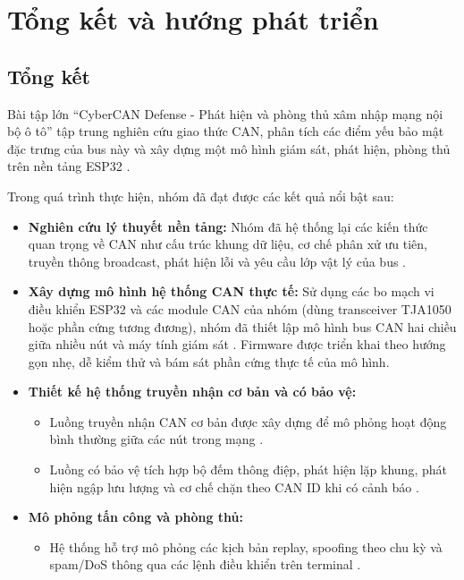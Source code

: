 \chapter{Tổng kết và hướng phát triển}

\section{Tổng kết}
Bài tập lớn ``CyberCAN Defense - Phát hiện và phòng thủ xâm nhập mạng nội bộ ô tô'' tập trung nghiên cứu giao thức CAN, phân tích các điểm yếu bảo mật đặc trưng của bus này và xây dựng một mô hình giám sát, phát hiện, phòng thủ trên nền tảng ESP32 \cite{bosch-can20,koscher2010,miller2015}.

Trong quá trình thực hiện, nhóm đã đạt được các kết quả nổi bật sau:
\begin{itemize}[leftmargin=*]
    \item \textbf{Nghiên cứu lý thuyết nền tảng:} Nhóm đã hệ thống lại các kiến thức quan trọng về CAN như cấu trúc khung dữ liệu, cơ chế phân xử ưu tiên, truyền thông broadcast, phát hiện lỗi và yêu cầu lớp vật lý của bus \cite{bosch-can20}.
    \item \textbf{Xây dựng mô hình hệ thống CAN thực tế:} Sử dụng các bo mạch vi điều khiển ESP32 và các module CAN của nhóm (dùng transceiver TJA1050 hoặc phần cứng tương đương), nhóm đã thiết lập mô hình bus CAN hai chiều giữa nhiều nút và máy tính giám sát \cite{espressif-twai,nxp-tja1050,bosch-can20}. Firmware được triển khai theo hướng gọn nhẹ, dễ kiểm thử và bám sát phần cứng thực tế của mô hình.
    \item \textbf{Thiết kế hệ thống truyền nhận cơ bản và có bảo vệ:}
    \begin{itemize}
        \item Luồng truyền nhận CAN cơ bản được xây dựng để mô phỏng hoạt động bình thường giữa các nút trong mạng \cite{koscher2010,miller2015}.
        \item Luồng có bảo vệ tích hợp bộ đếm thông điệp, phát hiện lặp khung, phát hiện ngập lưu lượng và cơ chế chặn theo CAN ID khi có cảnh báo \cite{koscher2010,miller2015}.
    \end{itemize}
    \item \textbf{Mô phỏng tấn công và phòng thủ:}
    \begin{itemize}
        \item Hệ thống hỗ trợ mô phỏng các kịch bản replay, spoofing theo chu kỳ và spam/DoS thông qua các lệnh điều khiển trên terminal \cite{koscher2010,miller2015}.

\end{itemize}
\end{itemize}
